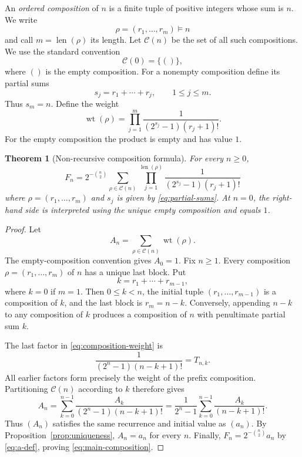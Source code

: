 \documentclass[11pt]{article}
\newtheorem{theorem}{Theorem}[section]
\theoremstyle{definition}
\theoremstyle{remark}
\newcommand{\Comp}{\mathcal{C}}
\newcommand{\wt}{\operatorname{wt}}
\newcommand{\len}{\operatorname{len}}
\begin{document}
An \emph{ordered composition} of $n$ is a finite tuple of positive integers
whose sum is $n$.  We write
\[
 \rho=(r_1,\ldots,r_m)\vDash n
\]
and call $m=\len(\rho)$ its length.  Let $\Comp(n)$ be the set of all such
compositions.  We use the standard convention
\[
 \Comp(0)=\{()\},
\]
where $()$ is the empty composition.  For a nonempty composition define its
partial sums
\begin{equation}\label{eq:partial-sums}
 s_j=r_1+\cdots+r_j,\qquad 1\leq j\leq m.
\end{equation}
Thus $s_m=n$.  Define the weight
\begin{equation}\label{eq:composition-weight}
 \wt(\rho)=
 \prod_{j=1}^{m}
 \frac{1}{(2^{s_j}-1)(r_j+1)!}.
\end{equation}
For the empty composition the product is empty and has value $1$.

\begin{theorem}[Non-recursive composition formula]\label{thm:composition}
For every $n\geq0$,
\begin{equation}\label{eq:main-composition}
 \boxed{
 F_n=2^{-\binom n2}
 \sum_{\rho\in\Comp(n)}
 \prod_{j=1}^{\len(\rho)}
 \frac{1}{(2^{s_j}-1)(r_j+1)!}}
\end{equation}
where $\rho=(r_1,\ldots,r_m)$ and $s_j$ is given by
\eqref{eq:partial-sums}.  At $n=0$, the right-hand side is interpreted using
the unique empty composition and equals $1$.
\end{theorem}

\begin{proof}
Let
\[
 A_n=\sum_{\rho\in\Comp(n)}\wt(\rho).
\]
The empty-composition convention gives $A_0=1$.  Fix $n\geq1$.  Every
composition $\rho=(r_1,\ldots,r_m)$ of $n$ has a unique last block.  Put
\[
 k=r_1+\cdots+r_{m-1},
\]
where $k=0$ if $m=1$.  Then $0\leq k<n$, the initial tuple
$(r_1,\ldots,r_{m-1})$ is a composition of $k$, and the last block is
$r_m=n-k$.  Conversely, appending $n-k$ to any composition of $k$ produces
a composition of $n$ with penultimate partial sum $k$.

The last factor in \eqref{eq:composition-weight} is
\[
 \frac{1}{(2^n-1)(n-k+1)!}=T_{n,k}.
\]
All earlier factors form precisely the weight of the prefix composition.
Partitioning $\Comp(n)$ according to $k$ therefore gives
\begin{equation}\label{eq:A-recurrence}
 A_n=\sum_{k=0}^{n-1}
 \frac{A_k}{(2^n-1)(n-k+1)!}
 =\frac{1}{2^n-1}
 \sum_{k=0}^{n-1}\frac{A_k}{(n-k+1)!}.
\end{equation}
Thus $(A_n)$ satisfies the same recurrence and initial value as $(a_n)$.
By Proposition~\ref{prop:uniqueness}, $A_n=a_n$ for every $n$.  Finally,
$F_n=2^{-\binom n2}a_n$ by \eqref{eq:a-def}, proving
\eqref{eq:main-composition}.
\end{proof}
\end{document}
